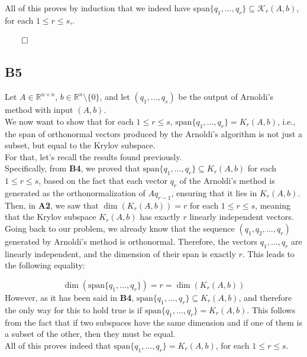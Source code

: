 \documentclass[a4paper,10pt]{article}
\begin{document}
  All of this proves by induction that we indeed have span$\{q_1,...,q_r\} \subseteq \mathcal{K}_r(A,b)$, for each $1\leq r \leq s$,.

  \begin{flushright}
    $\qed$
\end{flushright}

\subsection*{B5}

Let $A \in \mathbb{R}^{n \times n}$, $b \in \mathbb{R}^n \setminus \{0\}$, and let $(q_1,...,q_s)$ be the output of Arnoldi's method with input $(A,b)$.\\
We now want to show that for each \(1 \leq r \leq s\), \( \text{span}\{q_1, \dots, q_r\} = K_r(A, b)\), i.e., the span of orthonormal vectors produced by the Arnoldi's algorithm is not just a subset, but equal to the Krylov subspace.\\

For that, let's recall the results found previously.\\
Specifically, from \textbf{B4}, we proved that \( \text{span}\{q_1, \dots, q_r\} \subseteq K_r(A, b) \) for each \(1 \leq r \leq s\), based on the fact that each vector \(q_r\) of the Arnoldi's method is generated as the orthonormalization of \( A q_{r-1} \), ensuring that it lies in \(K_r(A, b)\). Then, in \textbf{A2}, we saw that \( \dim(K_r(A, b)) = r \) for each \(1 \leq r \leq s\), meaning that the Krylov subspace \(K_r(A, b)\) has exactly \(r\) linearly independent vectors.\\
   
Going back to our problem, we already know that the sequence \( (q_1, q_2, \dots, q_r) \) generated by Arnoldi's method is orthonormal. Therefore, the vectors \( q_1, \dots, q_r \) are linearly independent, and the dimension of their span is exactly \(r\). This leads to the following equality:
   
$$ \dim(\text{span}\{q_1, \dots, q_r\}) = r = \dim(K_r(A, b)) $$
However, as it has been said in \textbf{B4}, \( \text{span}\{q_1, \dots, q_r\} \subseteq K_r(A, b) \), and therefore the only way for this to hold true is if $\text{span}\{q_1, \dots, q_r\} = K_r(A, b)$. This follows from the fact that if two subspaces have the same dimension and if one of them is a subset of the other, then they must be equal.\\

     All of this proves indeed that \( \text{span}\{q_1, \dots, q_r\} = K_r(A, b)\), for each \(1 \leq r \leq s\).
\end{document}
